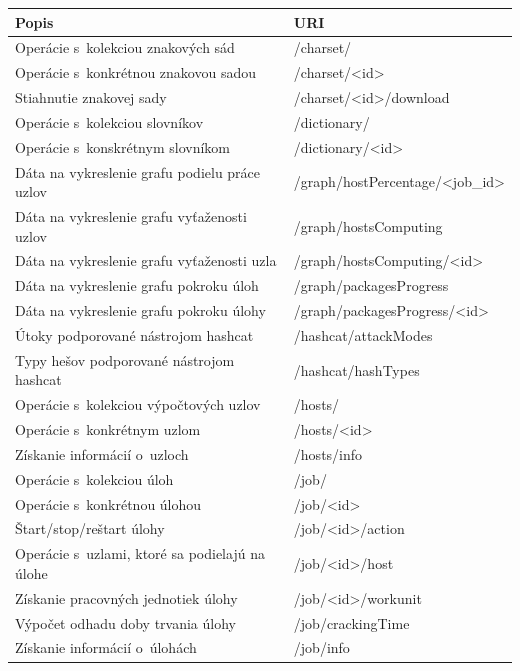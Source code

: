 \documentclass[slovak]{fitthesis}
\begin{document}
\begin{table}[h]
  \begin{center}
        \begin{tabular}{ |p{8cm}|p{7.4cm}|  }
         \hline
         Popis& URI\\
         \hline
          Operácie s~kolekciou znakových sád & /charset/ \\
          Operácie s~konkrétnou znakovou sadou & /charset/<id> \\
          Stiahnutie znakovej sady & /charset/<id>/download \\
          Operácie s~kolekciou slovníkov & /dictionary/ \\
          Operácie s~konskrétnym slovníkom & /dictionary/<id> \\
          Dáta na vykreslenie grafu podielu práce uzlov & /graph/hostPercentage/<job\_id> \\
          Dáta na vykreslenie grafu vyťaženosti uzlov & /graph/hostsComputing \\
          Dáta na vykreslenie grafu vyťaženosti uzla & /graph/hostsComputing/<id> \\
          Dáta na vykreslenie grafu pokroku úloh & /graph/packagesProgress \\
          Dáta na vykreslenie grafu pokroku úlohy & /graph/packagesProgress/<id> \\
          Útoky podporované nástrojom hashcat & /hashcat/attackModes \\
          Typy hešov podporované nástrojom hashcat & /hashcat/hashTypes \\
          Operácie s~kolekciou výpočtových uzlov & /hosts/ \\
          Operácie s~konkrétnym uzlom & /hosts/<id> \\
          Získanie informácií o~uzloch & /hosts/info \\
          Operácie s~kolekciou úloh & /job/ \\
          Operácie s~konkrétnou úlohou & /job/<id> \\
          Štart/stop/reštart úlohy & /job/<id>/action \\
          Operácie s~uzlami, ktoré sa podielajú na úlohe & /job/<id>/host \\
          Získanie pracovných jednotiek úlohy & /job/<id>/workunit \\
          Výpočet odhadu doby trvania úlohy & /job/crackingTime \\
          Získanie informácií o~úlohách & /job/info \\

\end{tabular}
\end{center}
\end{table}
\end{document}

